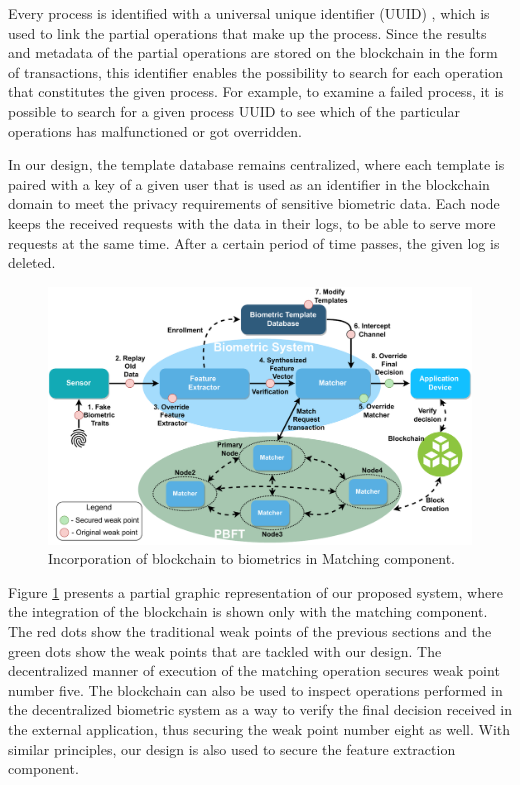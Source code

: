 Every process is identified with a universal unique identifier (UUID) \cite{UUIDCitation}, which is used to link the partial operations that make up the process. Since the results and metadata of the partial operations are stored on the blockchain in the form of transactions, this identifier enables the possibility to search for each operation that constitutes the given process. For example, to examine a failed process, it is possible to search for a given process UUID to see which of the particular operations has malfunctioned or got overridden. 

In our design, the template database remains centralized, where each template is paired with a key of a given user that is used as an identifier in the blockchain domain to meet the privacy requirements of sensitive biometric data. Each node keeps the received requests with the data in their logs, to be able to serve more requests at the same time. After a certain period of time passes, the given log is deleted. 

\begin{figure}[h]
	\centering
	\includegraphics[width=\linewidth]{obrazky-figures/BiometricSystemIntegrationWithBlockchain.pdf}
	\caption{Incorporation of blockchain to biometrics in Matching component.}
	\label{BiometricSystemBlockchainDiagram}
\end{figure}

Figure \ref{BiometricSystemBlockchainDiagram} presents a partial graphic representation of our proposed system, where the integration of the blockchain is shown only with the matching component. The red dots show the traditional weak points of the previous sections and the green dots show the weak points that are tackled with our design. The decentralized manner of execution of the matching operation secures weak point number five. The blockchain can also be used to inspect operations performed in the decentralized biometric system as a way to verify the final decision received in the external application, thus securing the weak point number eight as well. With similar principles, our design is also used to secure the feature extraction component.


